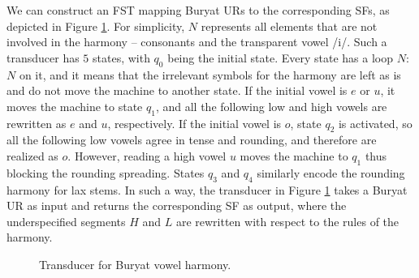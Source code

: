 We can construct an FST mapping Buryat URs to the corresponding SFs, as depicted in Figure \ref{buryattransducera}.
For simplicity, $N$ represents all elements that are not involved in the harmony -- consonants and the transparent vowel /i/.
Such a transducer has $5$ states, with $q_0$ being the initial state.
Every state has a loop $N$:$N$ on it, and it means that the irrelevant symbols for the harmony are left as is and do not move the machine to another state.
If the initial vowel is $e$ or $u$, it moves the machine to state $q_1$, and all the following low and high vowels are rewritten as $e$ and $u$, respectively.
If the initial vowel is $o$, state $q_2$ is activated, so all the following low vowels agree in tense and rounding, and therefore are realized as $o$.
However, reading a high vowel $u$ moves the machine to $q_1$ thus blocking the rounding spreading.
States $q_3$ and $q_4$ similarly encode the rounding harmony for lax stems.
In such a way, the transducer in Figure \ref{buryattransducera} takes a Buryat UR as input and returns the corresponding SF as output, where the underspecified segments $H$ and $L$ are rewritten with respect to the rules of the harmony.


\begin{figure}[h!] 
\centering
{}
\caption{Transducer for Buryat vowel harmony.}
\label{buryattransducera}
\end{figure}

